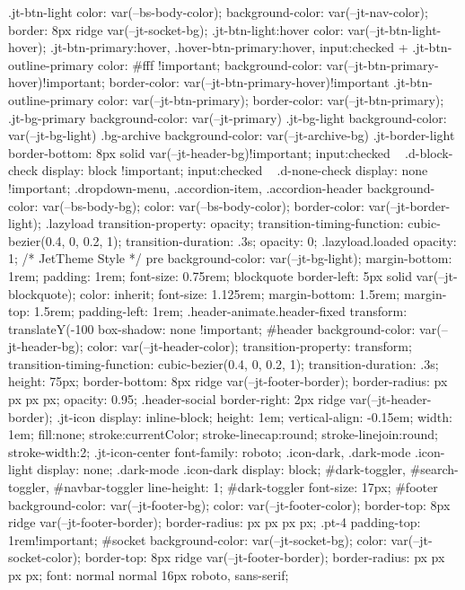 .jt-btn-light {
color: var(--bs-body-color);
background-color: var(--jt-nav-color);
border: 8px ridge var(--jt-socket-bg);
}
.jt-btn-light:hover {
color: var(--jt-btn-light-hover);
}
.jt-btn-primary:hover,
.hover-btn-primary:hover,
input:checked + .jt-btn-outline-primary {
color: #fff !important;
background-color: var(--jt-btn-primary-hover)!important;
border-color: var(--jt-btn-primary-hover)!important
}
.jt-btn-outline-primary {
color: var(--jt-btn-primary);
border-color: var(--jt-btn-primary);
}
.jt-bg-primary {
background-color: var(--jt-primary)
}
.jt-bg-light {
background-color: var(--jt-bg-light)
}
.bg-archive {
background-color: var(--jt-archive-bg)
}
.jt-border-light {
border-bottom: 8px solid var(--jt-header-bg)!important;
}
input:checked ~ .d-block-check {
display: block !important;
}
input:checked ~ .d-none-check {
display: none !important;
}
.dropdown-menu,
.accordion-item,
.accordion-header {
background-color: var(--bs-body-bg);
color: var(--bs-body-color);
border-color: var(--jt-border-light);
}
.lazyload {
transition-property: opacity;
transition-timing-function: cubic-bezier(0.4, 0, 0.2, 1);
transition-duration: .3s;
opacity: 0;
}
.lazyload.loaded {
opacity: 1;
}
/* JetTheme Style */
pre {
background-color: var(--jt-bg-light);
margin-bottom: 1rem;
padding: 1rem;
font-size: 0.75rem;
}
blockquote {
border-left:  5px solid var(--jt-blockquote);
color: inherit;
font-size: 1.125rem;
margin-bottom: 1.5rem;
margin-top: 1.5rem;
padding-left: 1rem;
}
.header-animate.header-fixed {
transform: translateY(-100%
box-shadow: none !important;
}
#header {
background-color: var(--jt-header-bg);
color: var(--jt-header-color);
transition-property: transform;
transition-timing-function: cubic-bezier(0.4, 0, 0.2, 1);
transition-duration: .3s;
height: 75px;
border-bottom: 8px ridge var(--jt-footer-border);
border-radius: px px px px;
opacity: 0.95;
}
.header-social {
border-right: 2px ridge var(--jt-header-border);
}
.jt-icon {
display: inline-block;
height: 1em;
vertical-align: -0.15em;
width: 1em;
fill:none;
stroke:currentColor;
stroke-linecap:round;
stroke-linejoin:round;
stroke-width:2;
}
.jt-icon-center {
font-family: roboto;
}
.icon-dark,
.dark-mode .icon-light {
display: none;
}
.dark-mode .icon-dark {
display: block;
}
#dark-toggler,
#search-toggler,
#navbar-toggler {
line-height: 1;
}
#dark-toggler {
font-size: 17px;
}
#footer {
background-color: var(--jt-footer-bg);
color: var(--jt-footer-color);
border-top: 8px ridge var(--jt-footer-border);
border-radius: px px px px;
}
.pt-4 {
padding-top: 1rem!important;
}
#socket {
background-color: var(--jt-socket-bg);
color: var(--jt-socket-color);
border-top: 8px ridge var(--jt-footer-border);
border-radius: px px px px;
font: normal normal 16px roboto, sans-serif;
}
